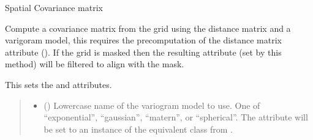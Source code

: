 \documentclass[letterpaper,10pt,english]{sphinxmanual}
\begin{document}
\begin{fulllineitems}
\begin{fulllineitems}
\end{fulllineitems}


\begin{fulllineitems}
\label{\detokenize{grid:glomar_gridding.grid.Grid.covariance}}
\pysigstartsignatures
\pysigline
{}
\pysigstopsignatures
\sphinxAtStartPar
Spatial Covariance matrix

\end{fulllineitems}


\begin{fulllineitems}
\label{\detokenize{grid:glomar_gridding.grid.Grid.covariance_matrix}}
\pysigstartsignatures
\pysiglinewithargsret
{}
{\sphinxparamcomma {}}
{}
\pysigstopsignatures
\sphinxAtStartPar
Compute a covariance matrix from the grid using the distance matrix and
a varigoram model, this requires the pre\sphinxhyphen{}computation of the distance
matrix attribute (). If the grid is masked then the resulting
 attribute (set by this method) will be filtered to align
with the mask.

\sphinxAtStartPar
This sets the  and  attributes.
\begin{quote}\begin{description}
\begin{itemize}
\item {}
\sphinxAtStartPar
{} () \textendash{} Lower\sphinxhyphen{}case name of the variogram model to use. One of “exponential”,
“gaussian”, “matern”, or “spherical”. The  attribute will
be set to an instance of the equivalent class from
.


\end{itemize}
\end{description}
\end{quote}
\end{fulllineitems}
\end{fulllineitems}
\end{document}
